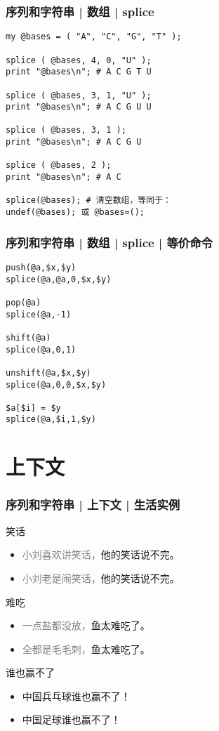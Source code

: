 \begin{frame}[fragile]
  \frametitle{序列和字符串 | 数组 | splice}
  \vspace{-1.5em}
\begin{lstlisting}
my @bases = ( "A", "C", "G", "T" );

splice ( @bases, 4, 0, "U" );
print "@bases\n"; # A C G T U

splice ( @bases, 3, 1, "U" );
print "@bases\n"; # A C G U U

splice ( @bases, 3, 1 );
print "@bases\n"; # A C G U

splice ( @bases, 2 );
print "@bases\n"; # A C

splice(@bases); # 清空数组，等同于：
undef(@bases); 或 @bases=();
\end{lstlisting}
\end{frame}

\begin{frame}[fragile]
  \frametitle{序列和字符串 | 数组 | splice | 等价命令}
  \vspace{-1.5em}
\begin{lstlisting}
push(@a,$x,$y)
splice(@a,@a,0,$x,$y)

pop(@a)
splice(@a,-1)

shift(@a)
splice(@a,0,1)

unshift(@a,$x,$y)
splice(@a,0,0,$x,$y)

$a[$i] = $y
splice(@a,$i,1,$y)
\end{lstlisting}
\end{frame}

\section{上下文}
\begin{frame}
  \frametitle{序列和字符串 | 上下文 | 生活实例}
  \begin{block}{笑话}
    \begin{itemize}
      \item \textcolor{gray}{小刘喜欢讲笑话，}他的笑话说不完。
      \item \textcolor{gray}{小刘老是闹笑话，}他的笑话说不完。
    \end{itemize}
  \end{block}
  \pause
  \begin{block}{难吃}
    \begin{itemize}
      \item \textcolor{gray}{一点盐都没放，}鱼太难吃了。
      \item \textcolor{gray}{全都是毛毛刺，}鱼太难吃了。
    \end{itemize}
  \end{block}
  \pause
  \begin{block}{谁也赢不了}
    \begin{itemize}
      \item 中国兵乓球谁也赢不了！
      \item 中国足球谁也赢不了！
    \end{itemize}
  \end{block}
\end{frame}

